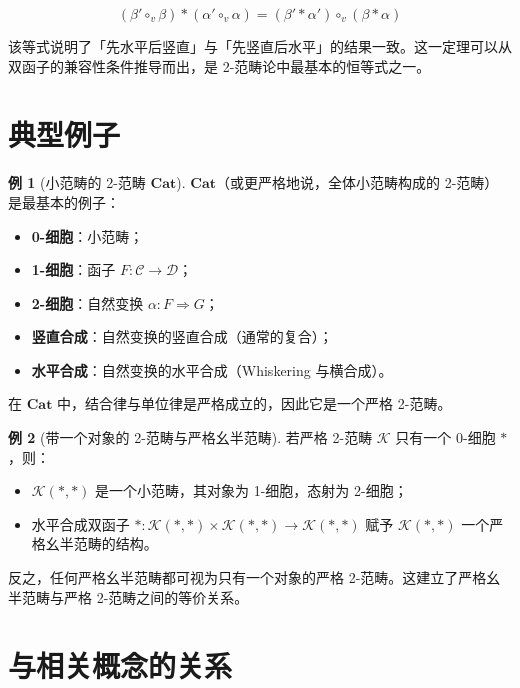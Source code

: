 \documentclass[UTF8,a4paper,12pt]{ctexart}
\theoremstyle{definition}
\newtheorem{example}{例}[section]
\theoremstyle{plain}
\newcommand{\cat}[1]{\mathcal{#1}}
\begin{document}
\[
(\beta' \circ_v \beta) * (\alpha' \circ_v \alpha) = (\beta' * \alpha') \circ_v (\beta * \alpha)
\]

该等式说明了「先水平后竖直」与「先竖直后水平」的结果一致。这一定理可以从双函子的兼容性条件推导而出，是 2-范畴论中最基本的恒等式之一。

\section{典型例子}

\begin{example}[小范畴的 2-范畴 $\mathbf{Cat}$]
\textbf{$\mathbf{Cat}$}（或更严格地说，全体小范畴构成的 2-范畴）是最基本的例子：
\begin{itemize}
  \item \textbf{0-细胞}：小范畴；
  \item \textbf{1-细胞}：函子 $F : \cat{C} \to \cat{D}$；
  \item \textbf{2-细胞}：自然变换 $\alpha : F \Rightarrow G$；
  \item \textbf{竖直合成}：自然变换的竖直合成（通常的复合）；
  \item \textbf{水平合成}：自然变换的水平合成（Whiskering 与横合成）。
\end{itemize}
在 $\mathbf{Cat}$ 中，结合律与单位律是严格成立的，因此它是一个严格 2-范畴。
\end{example}

\begin{example}[带一个对象的 2-范畴与严格幺半范畴]
若严格 2-范畴 $\cat{K}$ 只有一个 0-细胞 $*$，则：
\begin{itemize}
  \item $\cat{K}(*,*)$ 是一个小范畴，其对象为 1-细胞，态射为 2-细胞；
  \item 水平合成双函子 $* : \cat{K}(*,*) \times \cat{K}(*,*) \to \cat{K}(*,*)$ 赋予 $\cat{K}(*,*)$ 一个严格幺半范畴的结构。
\end{itemize}
反之，任何严格幺半范畴都可视为只有一个对象的严格 2-范畴。这建立了严格幺半范畴与严格 2-范畴之间的等价关系。
\end{example}

\section{与相关概念的关系}
\end{document}
